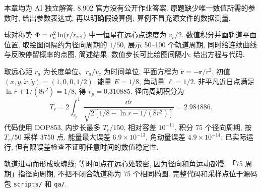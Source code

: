 本章均为 AI 独立解答. 8.902 官方没有公开作业答案. 原题缺少唯一数值所需的参数时, 给出参数表达式, 再以明确假设算例; 算例不冒充源文件的数据测量.

\begin{exercise}
球对称势 $\Phi=v_c^2\ln(r/r_{\rm ref})$ 中一恒星在远心点速度为 $v_c/2$. 数值积分并画轨道平面位置, 取绘图间隔约为径向周期的 $1/50$, 展示 50--100 个轨道周期, 同时给连续曲线与反映停留概率的点图, 简述结果. 数值步长可比绘图间隔小; 给出方程与代码.
\end{exercise}
\begin{solution}
取远心距 $r_a$ 为长度单位、$r_a/v_c$ 为时间单位, 平面方程为 $\ddot{\boldsymbol r}=-\boldsymbol r/r^2$, 初值 $(x,y,\dot x,\dot y)=(1,0,0,1/2)$. 能量 $E=1/8$, 角动量 $\ell=1/2$. 非平凡近日点满足 $\ln r+1/(8r^2)=1/8$, 得 $r_p=0.310885$. 径向周期积分为
\[
T_r=2\int_{r_p}^1\frac{\dd r}{\sqrt{2[1/8-\ln r-1/(8r^2)]}}=2.984886.
\]
代码使用 DOP853, 内步长最多 $T_r/150$, 相对容差 $10^{-11}$, 积分 75 个径向周期, 按 $T_r/50$ 采样 3750 点. 能量最大误差 $6.9\times10^{-13}$, 角动量误差 $4.9\times10^{-14}$; 已实际运行, 但有限误差检查不证明任意时间的数值稳定性.
\begin{center}\hfill
{}\end{center}
轨道进动而形成玫瑰线; 等时间点在远心处较密, 因为径向和角运动都慢. 「75 周期」指径向周期, 不把不闭合轨道称为 75 个相同椭圆. 完整代码和采样点位于源码包 \texttt{scripts/} 和 \texttt{qa/}.
\end{solution}

